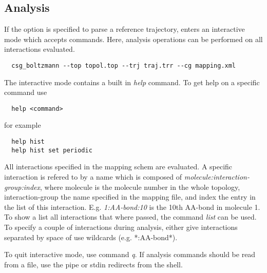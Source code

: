 \subsection{Analysis}
If the  option is specified to parse a reference trajectory,  enters an interactive mode which accepts commands. Here, analysis operations can be performed on all interactions evaluated.

\begin{verbatim}
  csg_boltzmann --top topol.top --trj traj.trr --cg mapping.xml 
\end{verbatim}

The interactive mode contains a built in \textit{help} command. To get help on a specific command use
\begin{verbatim}
  help <command>
\end{verbatim}
for example
\begin{verbatim}
  help hist
  help hist set periodic
\end{verbatim}

All interactions specified in the mapping schem are evaluated. A specific interaction is refered to by a name which is composed of \textit{molecule:interaction-group:index}, where molecule is the molecule number in the whole topology, interaction-group the name specified in the mapping file, and index the entry in the list of this interaction. E.g. \textit{1:AA-bond:10} is the 10th AA-bond in molecule 1. To show a list all interactions that where passed, the command \textit{list} can be used. To specify a couple of interactions during analysis, either give interactions separated by space of use wildcards (e.g. *:AA-bond*).

To quit interactive mode, use command \textit{q}. If analysis commands should be read from a file, use the pipe or stdin redirects from the shell.

